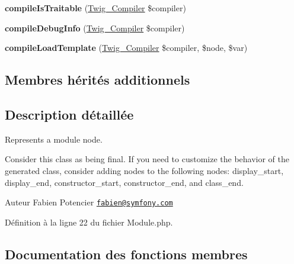 \begin{DoxyCompactItemize}
\item 
{\bfseries compile\+Is\+Traitable} (\hyperlink{class_twig___compiler}{Twig\+\_\+\+Compiler} \$compiler)\hypertarget{class_twig___node___module_a95e57609af2439a190ce9de5ee601708}{}\label{class_twig___node___module_a95e57609af2439a190ce9de5ee601708}

\item 
{\bfseries compile\+Debug\+Info} (\hyperlink{class_twig___compiler}{Twig\+\_\+\+Compiler} \$compiler)\hypertarget{class_twig___node___module_ac74ccb0e10bf3b910ca2b4c22df106dd}{}\label{class_twig___node___module_ac74ccb0e10bf3b910ca2b4c22df106dd}

\item 
{\bfseries compile\+Load\+Template} (\hyperlink{class_twig___compiler}{Twig\+\_\+\+Compiler} \$compiler, \$node, \$var)\hypertarget{class_twig___node___module_ad39e3a00959a71d8c5be836b71dd5327}{}\label{class_twig___node___module_ad39e3a00959a71d8c5be836b71dd5327}

\end{DoxyCompactItemize}
\subsection*{Membres hérités additionnels}


\subsection{Description détaillée}
Represents a module node.

Consider this class as being final. If you need to customize the behavior of the generated class, consider adding nodes to the following nodes\+: display\+\_\+start, display\+\_\+end, constructor\+\_\+start, constructor\+\_\+end, and class\+\_\+end.

\begin{DoxyAuthor}{Auteur}
Fabien Potencier \href{mailto:fabien@symfony.com}{\tt fabien@symfony.\+com} 
\end{DoxyAuthor}


Définition à la ligne 22 du fichier Module.\+php.



\subsection{Documentation des fonctions membres}
